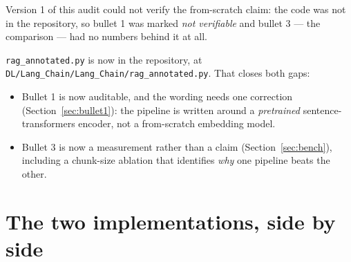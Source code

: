 \documentclass[11pt,a4paper]{article}
\begin{document}
Version 1 of this audit could not verify the from-scratch claim: the code was not
in the repository, so bullet 1 was marked \emph{not verifiable} and bullet 3 --- the
comparison --- had no numbers behind it at all.

\texttt{rag\_annotated.py} is now in the repository, at
\texttt{DL/Lang\_Chain/Lang\_Chain/rag\_annotated.py}. That closes both gaps:

\begin{itemize}
  \item Bullet 1 is now auditable, and the wording needs one correction
        (Section~\ref{sec:bullet1}): the pipeline is written around a
        \emph{pretrained} sentence-transformers encoder, not a from-scratch
        embedding model.
  \item Bullet 3 is now a measurement rather than a claim
        (Section~\ref{sec:bench}), including a chunk-size ablation that
        identifies \emph{why} one pipeline beats the other.
\end{itemize}

\section{The two implementations, side by side}
\end{document}
